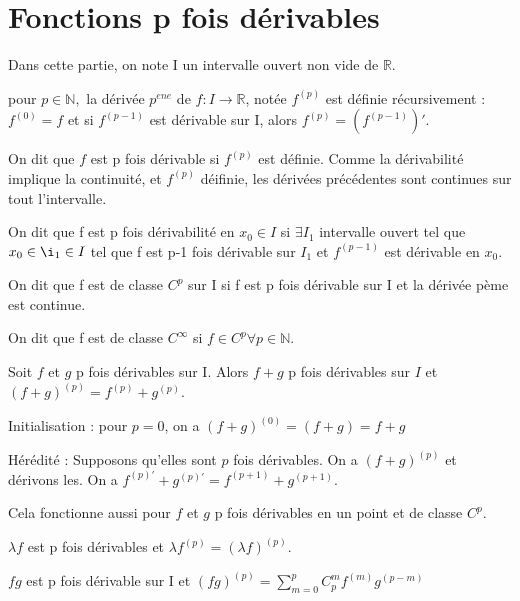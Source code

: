 \documentclass[french]{yLectureNote}
\newcommand{\N}[0]{\mathbb{N}}
\newcommand{\R}[0]{\mathbb{R}}
\begin{document}
\section{Fonctions p fois dérivables}
Dans cette partie, on note I un intervalle ouvert non vide de $\R$.
\begin{definition}
pour $p\in \N,$ la dérivée $p^{ene}$ de $f:I\to \R$, notée $f^{(p)}$ est définie récursivement : $f^{(0)} = f$ et si $f^{(p-1)}$ est dérivable sur I, alors $f^{(p)}  = (f^{(p-1)})'$.
\end{definition}
On dit que $f$ est p fois dérivable si $f^{(p)}$ est définie. Comme la dérivabilité implique la continuité, et $f^{(p)}$ déifinie, les dérivées précédentes sont continues sur tout l'intervalle.
\begin{definition}
On dit que f est p fois dérivabilité en \(x_0 \in I\) si \(\exists I_1\) intervalle ouvert tel que \(x_0\in\i_1\in I\) tel que f est p-1 fois dérivable sur \(I_1\) et \(f^{(p-1)}\) est dérivable en \(x_0\).
\end{definition}
\begin{definition}[Classe ]
On dit que f est de classe \(C^p\) sur I si f est p fois dérivable sur I et la dérivée pème est continue.

On dit que f est de classe \(C^{\infty}\) si \(f\in C^p \forall p\in\N\).
\end{definition}
\begin{proposition}
Soit \(f\) et \(g\) p fois dérivables sur I. Alors $f+g$ p fois dérivables sur $I$ et $(f+g)^{(p)} = f^{(p)} + g^{(p)}$.
\end{proposition}
\begin{myproof}
Initialisation : pour $p=0$, on a $(f+g)^{(0)} = (f+g) = f+g$

Hérédité : Supposons qu'elles sont $p$ fois dérivables. On a $(f+g)^{(p)}$ et dérivons les. On a $f^{(p)'} + g^{(p)'} = f^{(p+1)} + g^{(p+1)}$.
\end{myproof}
Cela fonctionne aussi pour $f$ et $g$ p fois dérivables en un point et de classe $C^p$.

\begin{proposition}
\(\lambda f\) est p fois dérivables et \(\lambda f^{(p)} = (\lambda f)^{(p)}\).
\end{proposition}
\begin{proposition}
\(fg\) est p fois dérivable sur I et \((fg)^{(p)} = \sum^p_{m=0} C^m_p f^{(m)}g^{(p-m)}\)
\end{proposition}
\newpage
{}
\end{document}
